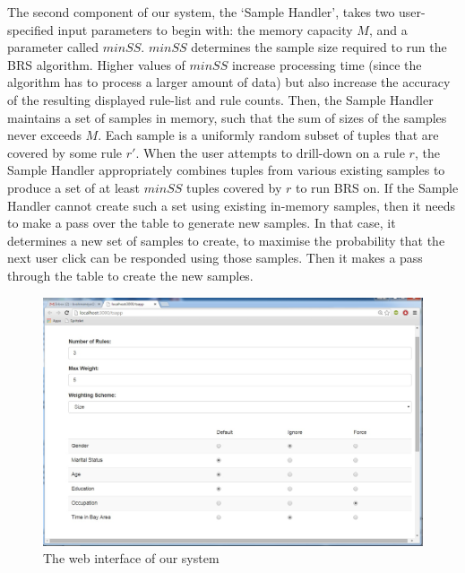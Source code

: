 The second component of our system, the `Sample Handler', takes two user-specified input parameters to begin with: the memory capacity $M$, and a parameter called $minSS$. $minSS$ determines the sample size required to run the BRS algorithm. Higher values of $minSS$ increase processing time (since the algorithm has to process a larger amount of data) but also increase the accuracy of the resulting displayed rule-list and rule counts. Then, the Sample Handler maintains a set of samples in memory, such that the sum of sizes of the samples never exceeds $M$. Each sample is a uniformly random subset of tuples that are covered by some rule $r'$. When the user attempts to drill-down on a rule $r$, the Sample Handler appropriately combines tuples from various existing samples to produce a set of at least $minSS$ tuples covered by $r$ to run BRS on. If the Sample Handler cannot create such a set using existing in-memory samples, then it needs to make a pass over the table to generate new samples. In that case, it determines a new set of samples to create, to maximise the probability that the next user click can be responded using those samples. Then it makes a pass through the table to create the new samples. 


\begin{figure}[ht]
\vspace{-5pt}
\centering
\includegraphics[width=160mm,frame]{graphs/uiscreenshot.jpg}
\vspace{-5pt}
\caption{The web interface of our system \label{fig:interface}}
\vspace{-5pt}
\end{figure}

